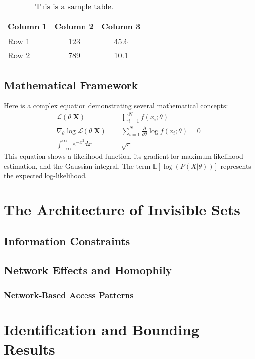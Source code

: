 \documentclass[11pt,letterpaper]{report}
\theoremstyle{definition}
\theoremstyle{remark}
\begin{document}
\begin{table}[h!]
\centering
\caption{This is a sample table.}
\label{tab:sample_table}
\begin{tabular}{@{}lcc@{}}
\toprule
Column 1 & Column 2 & Column 3 \\ \midrule
Row 1 & 123 & 45.6 \\
Row 2 & 789 & 10.1 \\ \bottomrule
\end{tabular}
\end{table}

\section{Mathematical Framework}
\lipsum[4-5]
Here is a complex equation demonstrating several mathematical concepts:
\begin{align}
    \mathcal{L}(\theta | \mathbf{X}) &= \prod_{i=1}^{N} f(x_i; \theta) \\
    \nabla_\theta \log \mathcal{L}(\theta | \mathbf{X}) &= \sum_{i=1}^{N} \frac{\partial}{\partial \theta} \log f(x_i; \theta) = 0 \\
    \int_{-\infty}^{\infty} e^{-x^2} dx &= \sqrt{\pi}
\end{align}
This equation shows a likelihood function, its gradient for maximum likelihood estimation, and the Gaussian integral. The term $\mathbb{E}[\log(P(X|\theta))]$ represents the expected log-likelihood.

\chapter{The Architecture of Invisible Sets}
\lipsum[1-2]

\section{Information Constraints}
\lipsum[3]

\section{Network Effects and Homophily}
\lipsum[4]
\subsection{Network-Based Access Patterns}
\lipsum[5]

\chapter{Identification and Bounding Results}
\lipsum[1]
\end{document}
